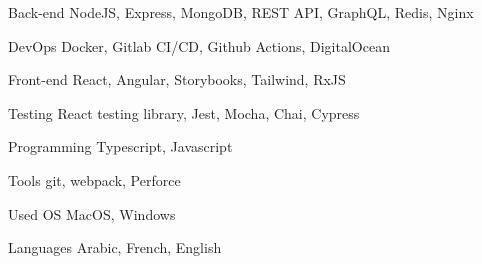 

\begin{cvskills}

  \cvskill
    {Back-end} %
    {NodeJS, Express, MongoDB, REST API, GraphQL, Redis, Nginx} %

  \cvskill
    {DevOps} %
    {Docker, Gitlab CI/CD, Github Actions, DigitalOcean} %

  \cvskill
    {Front-end} %
    {React, Angular, Storybooks, Tailwind, RxJS} %

  \cvskill
    {Testing} %
    {React testing library, Jest, Mocha, Chai, Cypress} %

  \cvskill
    {Programming} %
    {Typescript, Javascript} %

  \cvskill
    {Tools} %
    {git, webpack, Perforce} %

  \cvskill
    {Used OS} %
    {MacOS, Windows} %

  \cvskill
    {Languages} %
    {Arabic, French, English} %

\end{cvskills}
